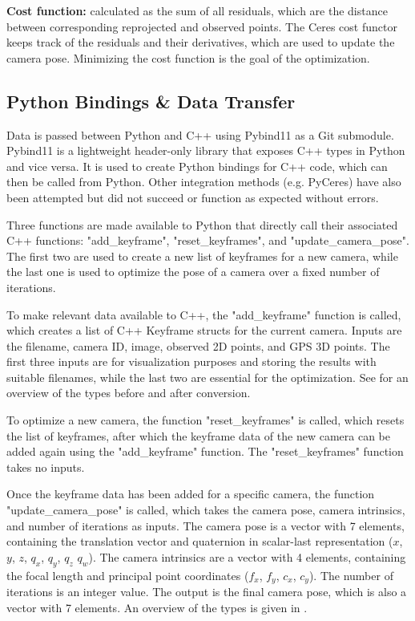 \textbf{Cost function:} calculated as the sum of all residuals, which are the distance between corresponding reprojected and observed points. The Ceres cost functor keeps track of the residuals and their derivatives, which are used to update the camera pose. Minimizing the cost function is the goal of the optimization.

\subsection*{Python Bindings \& Data Transfer}

Data is passed between Python and C++ using Pybind11 \cite{wenzel2023pybind11} as a Git submodule. Pybind11 is a lightweight header-only library that exposes C++ types in Python and vice versa. It is used to create Python bindings for C++ code, which can then be called from Python. Other integration methods (e.g. PyCeres) have also been attempted but did not succeed or function as expected without errors.

Three functions are made available to Python that directly call their associated C++ functions: "add\_keyframe", "reset\_keyframes", and "update\_camera\_pose". The first two are used to create a new list of keyframes for a new camera, while the last one is used to optimize the pose of a camera over a fixed number of iterations.

To make relevant data available to C++, the "add\_keyframe" function is called, which creates a list of C++ Keyframe structs for the current camera. Inputs are the filename, camera ID, image, observed 2D points, and GPS 3D points. The first three inputs are for visualization purposes and storing the results with suitable filenames, while the last two are essential for the optimization. See  for an overview of the types before and after conversion.

To optimize a new camera, the function "reset\_keyframes" is called, which resets the list of keyframes, after which the keyframe data of the new camera can be added again using the "add\_keyframe" function. The "reset\_keyframes" function takes no inputs.

Once the keyframe data has been added for a specific camera, the function "update\_camera\_pose" is called, which takes the camera pose, camera intrinsics, and number of iterations as inputs. The camera pose is a vector with 7 elements, containing the translation vector and quaternion in scalar-last representation ($x$, $y$, $z$, $q_x$, $q_y$, $q_z$ $q_w$). The camera intrinsics are a vector with 4 elements, containing the focal length and principal point coordinates ($f_x$, $f_y$, $c_x$, $c_y$). The number of iterations is an integer value. The output is the final camera pose, which is also a vector with 7 elements. An overview of the types is given in .

